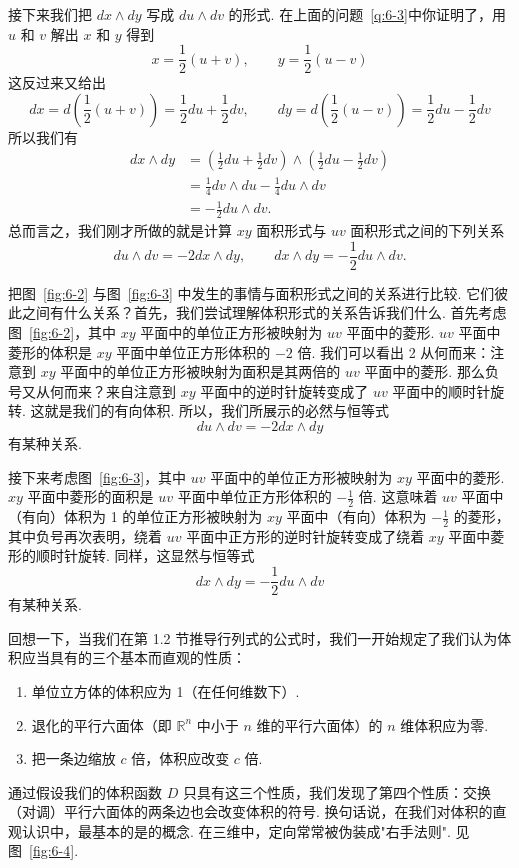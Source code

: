 接下来我们把 $dx\wedge dy$ 写成 $du\wedge dv$ 的形式. 在上面的问题~\ref{q:6-3}中你证明了，用 $u$ 和 $v$ 解出 $x$ 和 $y$ 得到
\[
x=\frac12(u+v),\qquad y=\frac12(u-v)
\]
这反过来又给出
\[
dx=d\left(\frac12(u+v)\right)=\frac12du+\frac12dv,\qquad
dy=d\left(\frac12(u-v)\right)=\frac12du-\frac12dv
\]
所以我们有
\begin{align*}
dx\wedge dy&=\left(\frac12du+\frac12dv\right)\wedge\left(\frac12du-\frac12dv\right)\\
&=\frac14dv\wedge du-\frac14du\wedge dv\\
&=-\frac12du\wedge dv.
\end{align*}
总而言之，我们刚才所做的就是计算 $xy$ 面积形式与 $uv$ 面积形式之间的下列关系
\[
du\wedge dv=-2dx\wedge dy,\qquad dx\wedge dy=-\frac12du\wedge dv.
\]

把图~\ref{fig:6-2} 与图~\ref{fig:6-3} 中发生的事情与面积形式之间的关系进行比较. 它们彼此之间有什么关系？首先，我们尝试理解体积形式的关系告诉我们什么. 首先考虑图~\ref{fig:6-2}，其中 $xy$ 平面中的单位正方形被映射为 $uv$ 平面中的菱形. $uv$ 平面中菱形的体积是 $xy$ 平面中单位正方形体积的 $-2$ 倍. 我们可以看出 2 从何而来：注意到 $xy$ 平面中的单位正方形被映射为面积是其两倍的 $uv$ 平面中的菱形. 那么负号又从何而来？来自注意到 $xy$ 平面中的逆时针旋转变成了 $uv$ 平面中的顺时针旋转. 这就是我们的有向体积. 所以，我们所展示的必然与恒等式
\[
du\wedge dv=-2dx\wedge dy
\]
有某种关系.

接下来考虑图~\ref{fig:6-3}，其中 $uv$ 平面中的单位正方形被映射为 $xy$ 平面中的菱形. $xy$ 平面中菱形的面积是 $uv$ 平面中单位正方形体积的 $-\frac12$ 倍. 这意味着 $uv$ 平面中（有向）体积为 1 的单位正方形被映射为 $xy$ 平面中（有向）体积为 $-\frac12$ 的菱形，其中负号再次表明，绕着 $uv$ 平面中正方形的逆时针旋转变成了绕着 $xy$ 平面中菱形的顺时针旋转. 同样，这显然与恒等式
\[
dx\wedge dy=-\frac12du\wedge dv
\]
有某种关系.

回想一下，当我们在第 1.2 节推导行列式的公式时，我们一开始规定了我们认为体积应当具有的三个基本而直观的性质：
\begin{enumerate}
  \item 单位立方体的体积应为 1（在任何维数下）.
  \item 退化的平行六面体（即 $\mathbb{R}^n$ 中小于 $n$ 维的平行六面体）的 $n$ 维体积应为零.
  \item 把一条边缩放 $c$ 倍，体积应改变 $c$ 倍.
\end{enumerate}
通过假设我们的体积函数 $D$ 只具有这三个性质，我们发现了第四个性质：交换（对调）平行六面体的两条边也会改变体积的符号. 换句话说，在我们对体积的直观认识中，最基本的是的概念. 在三维中，定向常常被伪装成"右手法则". 见图~\ref{fig:6-4}.


